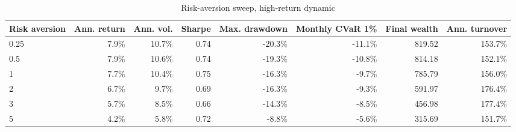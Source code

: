 ﻿\begin{table}[!htbp]
\centering
\caption{Risk-aversion sweep, high-return dynamic}
\label{tab:allocation-risk-aversion-high-return}
\small
\setlength{\tabcolsep}{5pt}
\renewcommand{\arraystretch}{1.12}
\begin{adjustbox}{center,max width=\linewidth}
\begin{tabular}{lrrrrrrr}
\toprule
Risk aversion & Ann. return & Ann. vol. & Sharpe & Max. drawdown & Monthly CVaR 1\% & Final wealth & Ann. turnover \\
\midrule
0.25 & 7.9\% & 10.7\% & 0.74 & -20.3\% & -11.1\% & 819.52 & 153.7\% \\
0.5 & 7.9\% & 10.6\% & 0.74 & -19.3\% & -10.8\% & 814.18 & 152.1\% \\
1 & 7.7\% & 10.4\% & 0.75 & -16.3\% & -9.7\% & 785.79 & 156.0\% \\
2 & 6.7\% & 9.7\% & 0.69 & -16.3\% & -9.3\% & 591.97 & 176.4\% \\
3 & 5.7\% & 8.5\% & 0.66 & -14.3\% & -8.5\% & 456.98 & 177.4\% \\
5 & 4.2\% & 5.8\% & 0.72 & -8.8\% & -5.6\% & 315.69 & 151.7\% \\
\bottomrule
\end{tabular}
\end{adjustbox}
\end{table}
